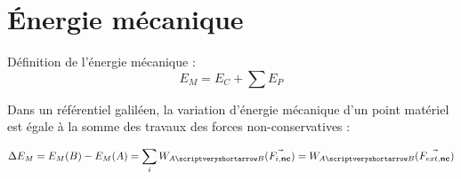 \documentclass[13pt, twoside, a4paper, french]{report}
\begin{document}
        \section{Énergie mécanique}\label{sec:energie-mecanique}

            Définition de l'énergie mécanique :
            \[E_M = E_C + \sum E_P\]

            Dans un référentiel galiléen, la variation d’énergie mécanique d’un point matériel est égale à la somme des travaux des forces non-conservatives :

            \[\Delta E_M = E_M(B) - E_M(A) = \sum_i W_{A \scriptveryshortarrow B}(\vec{F_{i,\textbf{nc}}}) = W_{A \scriptveryshortarrow B}(\vec{F_{ext,\textbf{nc}}})\]
\end{document}
